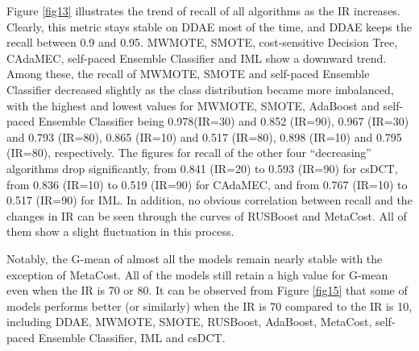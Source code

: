 Figure \ref{fig13} illustrates the trend of recall of all algorithms as the IR increases. Clearly, this metric stays stable on DDAE most of the time, and DDAE keeps the recall between 0.9 and 0.95. MWMOTE, SMOTE, cost-sensitive Decision Tree, CAdaMEC, self-paced Ensemble Classifier and IML show a downward trend. Among these, the recall of MWMOTE, SMOTE and self-paced Ensemble Classifier decreased slightly as the class distribution became more imbalanced, with the highest and lowest values for MWMOTE, SMOTE, AdaBoost and self-paced Ensemble Classifier being 0.978(IR=30) and 0.852 (IR=90), 0.967 (IR=30) and 0.793 (IR=80), 0.865 (IR=10) and 0.517 (IR=80), 0.898 (IR=10) and 0.795 (IR=80), respectively. The figures for recall of the other four ``decreasing'' algorithms drop significantly, from 0.841 (IR=20) to 0.593 (IR=90) for csDCT, from 0.836 (IR=10) to 0.519 (IR=90) for CAdaMEC, and from 0.767 (IR=10) to 0.517 (IR=90) for IML. In addition, no obvious correlation between recall and the changes in IR can be seen through the curves of RUSBoost and MetaCost. All of them show a slight fluctuation in this process.


Notably, the G-mean of almost all the models remain nearly stable with the exception of MetaCost. All of the models still retain a high value for G-mean even when the IR is 70 or 80. It can be observed from Figure \ref{fig15} that some of models performs better (or similarly) when the IR is 70 compared to the IR is 10, including DDAE, MWMOTE, SMOTE, RUSBoost, AdaBoost, MetaCost, self-paced Ensemble Classifier, IML and csDCT. 






